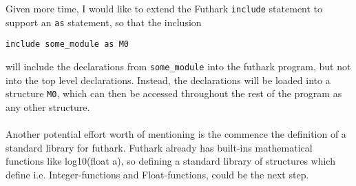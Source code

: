 Given more time, I would like to extend the Futhark \texttt{include} statement
to support an \texttt{as} statement, so that the inclusion

\texttt{include some\_module as M0}

will include the declarations from \texttt{some\_module} into the futhark program, but not
into the top level declarations. Instead, the declarations will be loaded into a
structure \texttt{M0}, which can then be accessed throughout the rest of the program as
any other structure.
\\
\\
Another potential effort worth of mentioning is the commence the definition of a
standard library for futhark. Futhark already has built-ins mathematical
functions like log10(float a), so defining a standard library of structures
which define i.e. Integer-functions and Float-functions, could be the next step.